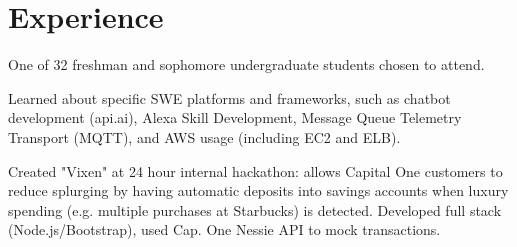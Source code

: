 \documentclass[]{deedy-resume-openfont}
\begin{document}
\hfill
\begin{minipage}[t]{0.66\textwidth} 


\section{Experience}
{}
\vspace{\topsep} %
\begin{tightemize}
\item One of 32 freshman and sophomore undergraduate students chosen to attend.
\item Learned about specific SWE platforms and frameworks, such as chatbot development (api.ai), Alexa Skill Development, Message Queue Telemetry Transport (MQTT), and AWS usage (including EC2 and ELB).
\item Created "Vixen" at 24 hour internal hackathon: allows Capital One customers to reduce splurging by having automatic deposits into savings accounts when luxury spending (e.g. multiple purchases at Starbucks) is detected. Developed full stack (Node.js/Bootstrap), used Cap. One Nessie API to mock transactions.
\end{tightemize}
\sectionsep


\end{minipage}
\end{document}
